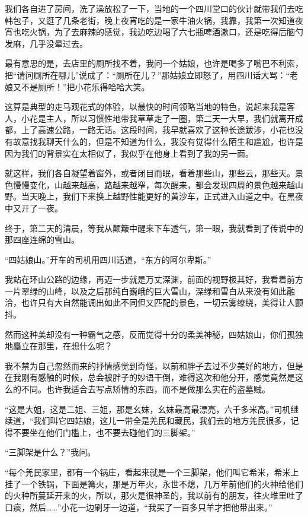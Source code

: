 我们各自进了房间，洗了澡放松了一下，当地的一个四川堂口的伙计就带我们去吃韩包子，又逛了几条老街，晚上夜宵吃的是一家牛油火锅，我靠，我第一次知道夜宵也吃火锅，为了去麻辣的感觉，我边吃边喝了六七瓶啤酒漱口，还是吃得后脑勺发麻，几乎没晕过去。

最有意思的是，去店里的厕所找不着，我问一个姑娘，也许是喝多了嘴巴不利索，把“请问厕所在哪儿”说成了：“厕所在儿？”那姑娘立即怒了，用四川话大骂：“老娘又不是厕所！”把小花乐得哈哈大笑。

这算是典型的走马观花式的体验，以最快的时间领略当地的特色，说起来我是客人，小花是主人，所以习惯性地带我草草走了一圈，第二天一大早，我们就离开成都，上了高速公路，一路无话。这段时间，我早就喜欢了这种长途跋涉，小花也没有故意找我聊天什么的，但是不知道为什么，我没有觉得什么陌生和尴尬，也许是因为我们的背景实在太相似了，我似乎在他身上看到了我的另一面。

就这样，我们各自凝望着窗外，或者闭目而眠，看着那些山，那些云，那些天。景色慢慢变化，山越来越高，路越来越窄，每次醒来，都会发现四周的景色越来越山野。当天晚上，我们下来换上越野性能更好的黄沙车，正式进入山道之中。在黑夜中又开了一夜。

终于，第二天的清晨，等我从颠簸中醒来下车透气，第一眼，我就看到了传说中的那四座连绵的雪山。

“四姑娘山。”开车的司机用四川话道，“东方的阿尔卑斯。”

我站在环山公路的边缘，再迈一步就是万丈深渊，前面的视野极其好，我看着前方一片翠绿的山峰，以及之后那纯白巍峨的巨大雪山，深绿和雪白从来没有如此融洽，也许只有大自然能调出如此不同但又匹配的景色，一切云雾缭绕，美得让人颤抖。

然而这种美却没有一种霸气之感，反而觉得十分的柔美神秘，四姑娘山，你们孤独地矗立在那里，在想什么呢？

我不禁为自己忽然而来的抒情感觉到奇怪，以前和胖子去过不少美好的地方，但是在我刚有感触的时候，总会被胖子的妙语干倒，难得这次和他分开，感觉竟然是这么的不同。也许我适合去写点矫情的东西，而不是做那么实在的盗墓贼。

“这是大姐，这是二姐、三姐，那是幺妹，幺妹最高最漂亮，六千多米高。”司机继续道，“我们叫它四姑娘，这儿一带全是羌民和藏民，我们去的地方羌民很多，记得不要坐在他们门槛上，也不要去碰他们的三脚架。”

“三脚架是什么？”我问。

“每个羌民家里，都有一个锅庄，看起来就是一个三脚架，他们叫它希米，希米上挂了一个铁锅，下面是篝火，那是万年火，永世不熄，几万年前他们的火神给他们的火种所蔓延开来的火，所以，那火是很神圣的，我以前有的朋友，往火堆里吐了口痰，然后……”小花一边刷牙一边道，“我买了一百多只羊才把他带出来。”

